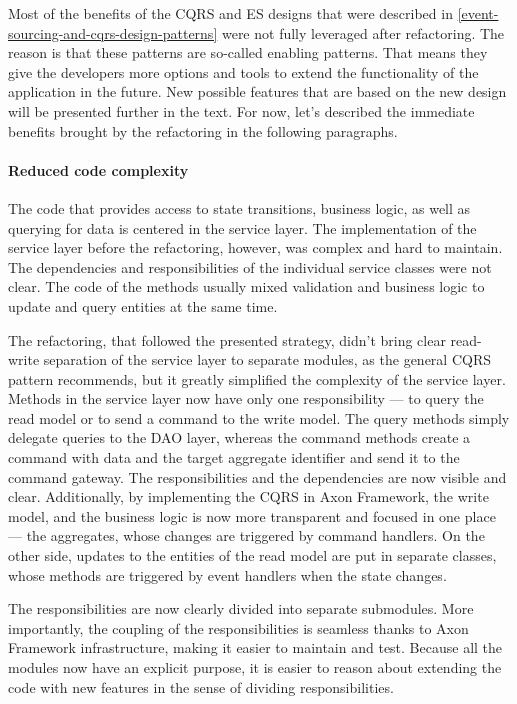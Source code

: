\documentclass{book}
\begin{document}
Most of the benefits of the CQRS and ES designs that were described in
\ref{event-sourcing-and-cqrs-design-patterns}
 were not fully
leveraged after refactoring. The reason is that these patterns are
so-called enabling patterns. That means they give the developers more
options and tools to extend the functionality of the application in the
future. New possible features that are based on the new design will be
presented further in the text. For now, let's described the immediate
benefits brought by the refactoring in the following paragraphs.

\paragraph{Reduced code complexity}\label{reduced-code-complexity}

The code that provides access to state transitions, business logic, as
well as querying for data is centered in the service layer. The
implementation of the service layer before the refactoring, however, was
complex and hard to maintain. The dependencies and responsibilities of
the individual service classes were not clear. The code of the methods
usually mixed validation and business logic to update and query entities
at the same time.

The refactoring, that followed the presented strategy, didn't bring
clear read-write separation of the service layer to separate modules, as
the general CQRS pattern recommends, but it greatly simplified the
complexity of the service layer. Methods in the service layer now have
only one responsibility --- to query the read model or to send a command
to the write model. The query methods simply delegate queries to the DAO
layer, whereas the command methods create a command with data and the
target aggregate identifier and send it to the command gateway. The
responsibilities and the dependencies are now visible and clear.
Additionally, by implementing the CQRS in Axon Framework, the write
model, and the business logic is now more transparent and focused in one
place --- the aggregates, whose changes are triggered by command
handlers. On the other side, updates to the entities of the read model
are put in separate classes, whose methods are triggered by event
handlers when the state changes.

The responsibilities are now clearly divided into separate submodules.
More importantly, the coupling of the responsibilities is seamless
thanks to Axon Framework infrastructure, making it easier to maintain
and test. Because all the modules now have an explicit purpose, it is
easier to reason about extending the code with new features in the sense
of dividing responsibilities.
\end{document}
